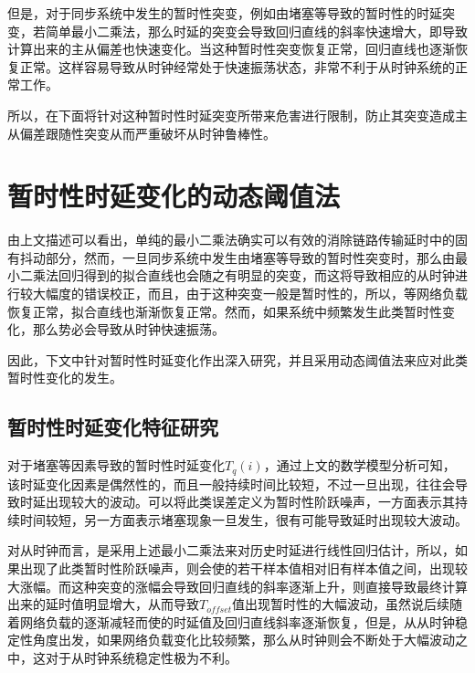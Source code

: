 但是，对于同步系统中发生的暂时性突变，例如由堵塞等导致的暂时性的时延突变，若简单最小二乘法，那么时延的突变会导致回归直线的斜率快速增大，即导致计算出来的主从偏差也快速变化。当这种暂时性突变恢复正常，回归直线也逐渐恢复正常。这样容易导致从时钟经常处于快速振荡状态，非常不利于从时钟系统的正常工作。

所以，在下面将针对这种暂时性时延突变所带来危害进行限制，防止其突变造成主从偏差跟随性突变从而严重破坏从时钟鲁棒性。

\section{暂时性时延变化的动态阈值法}
由上文描述可以看出，单纯的最小二乘法确实可以有效的消除链路传输延时中的固有抖动部分，然而，一旦同步系统中发生由堵塞等导致的暂时性突变时，那么由最小二乘法回归得到的拟合直线也会随之有明显的突变，而这将导致相应的从时钟进行较大幅度的错误校正，而且，由于这种突变一般是暂时性的，所以，等网络负载恢复正常，拟合直线也渐渐恢复正常。然而，如果系统中频繁发生此类暂时性变化，那么势必会导致从时钟快速振荡。

因此，下文中针对暂时性时延变化作出深入研究，并且采用动态阈值法来应对此类暂时性变化的发生。


\subsection{暂时性时延变化特征研究}
对于堵塞等因素导致的暂时性时延变化$T_{q}(i)$，通过上文的数学模型分析可知，该时延变化因素是偶然性的，而且一般持续时间比较短，不过一旦出现，往往会导致时延出现较大的波动。可以将此类误差定义为暂时性阶跃噪声，一方面表示其持续时间较短，另一方面表示堵塞现象一旦发生，很有可能导致延时出现较大波动。

对从时钟而言，是采用上述最小二乘法来对历史时延进行线性回归估计，所以，如果出现了此类暂时性阶跃噪声，则会使的若干样本值相对旧有样本值之间，出现较大涨幅。而这种突变的涨幅会导致回归直线的斜率逐渐上升，则直接导致最终计算出来的延时值明显增大，从而导致$T_{offset}$值出现暂时性的大幅波动，虽然说后续随着网络负载的逐渐减轻而使的时延值及回归直线斜率逐渐恢复，但是，从从时钟稳定性角度出发，如果网络负载变化比较频繁，那么从时钟则会不断处于大幅波动之中，这对于从时钟系统稳定性极为不利。

